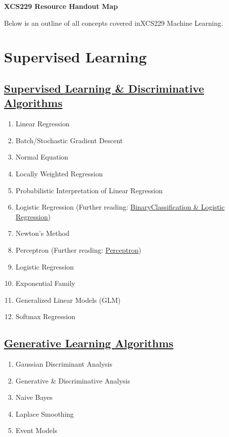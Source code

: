\documentclass{article}
\begin{document}
\begin{center}
  \textbf{\large{XCS229 Resource Handout Map}}

  \small{Below is an outline of all concepts covered inXCS229 Machine Learning.}
\end{center}

\vspace{-2.5mm}
\section{Supervised Learning}
\vspace{-2.5mm}
\subsection{ \href{https://github.com/scpd-proed/XCS229-Handouts/blob/main/Supervised\%20Learning\%20and\%20Discriminative\%20Algorithms.pdf}{Supervised Learning \& Discriminative Algorithms}}
\vspace{-2.5mm}
\begin{enumerate}
  \setlength\itemsep{-0.25em}
  \item Linear Regression
  \item Batch/Stochastic Gradient Descent
  \item Normal Equation
  \item Locally Weighted Regression
  \item Probabilistic Interpretation of Linear Regression
  \item Logistic Regression (Further reading: \href{https://github.com/scpd-proed/XCS229-Handouts/blob/main/Binary\%20Classification\%20and\%20Logistic\%20Regression.pdf}{BinaryClassification \& Logistic Regression})
  \item Newton’s Method
  \item Perceptron (Further reading: \href{https://github.com/scpd-proed/XCS229-Handouts/blob/main/Perceptron.pdf}{Perceptron})
  \item Logistic Regression
  \item Exponential Family
  \item Generalized Linear Models (GLM)
  \item Softmax Regression
\end{enumerate}
\vspace{-2.5mm}
\subsection{\href{https://github.com/scpd-proed/XCS229-Handouts/blob/main/Generative\%20Learning\%20Algorithms.pdf}{Generative Learning Algorithms}}
\vspace{-2.5mm}
\begin{enumerate}
  \setlength\itemsep{-0.25em}
  \item Gaussian Discriminant Analysis
  \item Generative \& Discriminative Analysis
  \item Naive Bayes
  \item Laplace Smoothing
  \item Event Models
\end{enumerate}
\vspace{-2.5mm}
\end{document}
